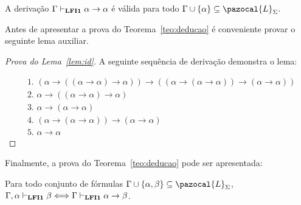     
    \begin{lema}
        \label{lem:id}
        A derivação $\Gamma \vdash_{\textbf{LFI1}{}} \alpha \to \alpha$ é válida para todo $\Gamma \cup \{\alpha\} \subseteq \pazocal{L}_{\Sigma}$.
    \end{lema}
    
    \noindent Antes de apresentar a prova do Teorema~\ref{teo:deducao} é conveniente provar o seguinte lema auxiliar. 
    \begin{proof}[Prova do Lema~\ref{lem:id}]
        A seguinte sequência de derivação demonstra o lema:
        
        \begin{align*}
            & \text{1. } (\alpha \to ((\alpha \to \alpha) \to \alpha)) \to ((\alpha \to (\alpha \to \alpha)) \to (\alpha \to \alpha))\tag{Ax2}\\
            & \text{2. } \alpha \to ((\alpha \to \alpha) \to \alpha)\tag{Ax1}\\
            & \text{3. } \alpha \to (\alpha \to \alpha)\tag{Ax1}\\
            & \text{4. } (\alpha \to (\alpha \to \alpha)) \to (\alpha \to \alpha)\tag{MP 1,2}\\
            & \text{5. } \alpha \to \alpha\tag{MP 3,4}
        \end{align*}
    \end{proof}
    
    \noindent Finalmente, a prova do Teorema~\ref{teo:deducao} pode ser apresentada:
    
    \begin{teorema}
        \label{teo:deducao}
        Para todo conjunto de fórmulas $\Gamma \cup \{\alpha, \beta \} \subseteq \pazocal{L}_{\Sigma}$, $\Gamma, \alpha \vdash_{\textbf{LFI1}{}} \beta \Longleftrightarrow \Gamma \vdash_{\textbf{LFI1}{}} \alpha \to \beta$.
    \end{teorema}


